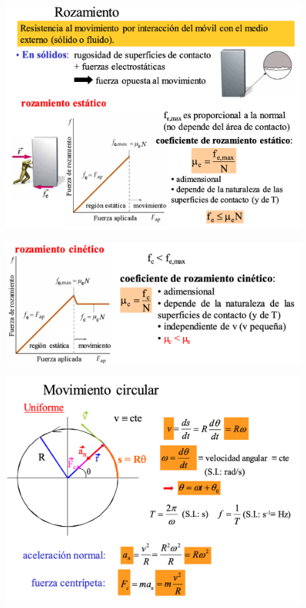 \begin{figure}[H]
		\centering
		\includegraphics[width=1\textwidth]{imagenes/imagenes03/T03IM07.png}
		\end{figure}
		
		
\begin{figure}[H]
		\centering
		\includegraphics[width=1\textwidth]{imagenes/imagenes03/T03IM08.png}
		\end{figure}		

\newpage %

\begin{figure}[H]
		\centering
		\includegraphics[width=.95\textwidth]{imagenes/imagenes02/T02IM31.png}
		\end{figure}

